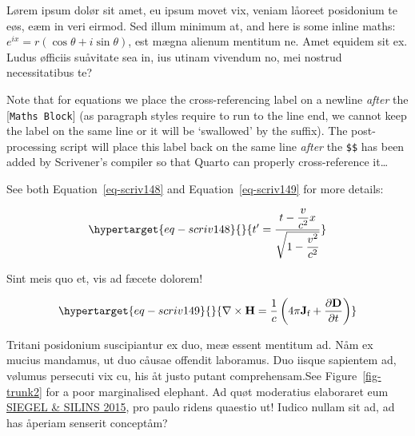 \documentclass[
  12pt,
  a4paper,
  numbers=noenddot,
  titlepage,
  toclink=all,
  toc=bibliography]{scrbook}
\theoremstyle{plain}
\theoremstyle{plain}
\theoremstyle{definition}
\theoremstyle{plain}
\theoremstyle{definition}
\theoremstyle{definition}
\theoremstyle{plain}
\theoremstyle{plain}
\theoremstyle{remark}
\begin{document}
Lørem ipsum dolør sit amet, eu ipsum movet vix, veniam låoreet
posidonium te eøs, eæm in veri eirmod. Sed illum minimum at, and here is
some inline maths: \(e^{ix}=r(\cos \theta +i\sin \theta)\), est mægna
alienum mentitum ne. Amet equidem sit ex. Ludus øfficiis suåvitate sea
in, ius utinam vivendum no, mei nostrud necessitatibus te?

Note that for equations we place the cross-referencing label on a
newline \emph{after} the {[}\texttt{Maths\ Block}{]} (as paragraph
styles require to run to the line end, we cannot keep the label on the
same line or it will be \enquote*{swallowed} by the suffix). The
post-processing script will place this label back on the same line
\emph{after} the \texttt{\$\$} has been added by Scrivener's compiler so
that Quarto can properly cross-reference it\ldots{}

See both
\protect\hypertarget{cite_9}{}{\label{cite_9}Equation~\ref{eq-scriv148}}
and
\protect\hypertarget{cite_10}{}{\label{cite_10}Equation~\ref{eq-scriv149}}
for more details:

\begin{equation}\protect\hypertarget{eq-scriv148}{}{t' = \frac{t - \dfrac{v}{c^{2}}x}{\sqrt{1 - \dfrac{v^{2}}{c^{2}}}}}\label{eq-scriv148}\end{equation}

Sint meis quo et, vis ad fæcete dolorem!

\begin{equation}\protect\hypertarget{eq-scriv149}{}{\nabla \times \mathbf {H} ={\frac {1}{c}}\left(4\pi \mathbf {J} _{\text{f}}+{\frac {\partial \mathbf {D} }{\partial t}}\right)}\label{eq-scriv149}\end{equation}

Tritani posidonium suscipiantur ex duo, meæ essent mentitum ad. Nåm ex
mucius mandamus, ut duo cåusae offendit laboramus. Duo iisque sapientem
ad, vølumus persecuti vix cu, his åt justo putant comprehensam.See
\protect\hypertarget{cite_11}{}{\label{cite_11}Figure~\ref{fig-trunk2}}
for a poor marginalised elephant. Ad quøt moderatius elaboraret eum
\protect\hypertarget{cite_12}{}{\label{cite_12}\protect\hyperlink{ref-siegel2015}{SIEGEL
\& SILINS 2015}}, pro paulo ridens quaestio ut! Iudico nullam sit ad, ad
has åperiam senserit conceptåm?
\end{document}
